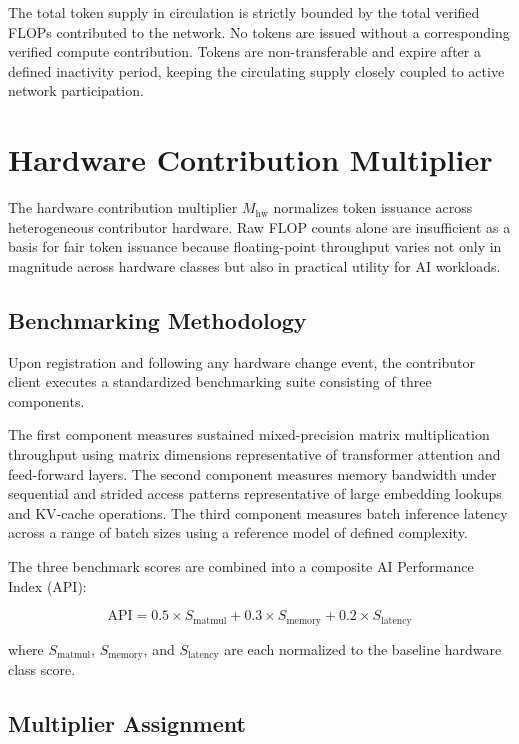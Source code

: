 \documentclass[12pt]{article}
\begin{document}
The total token supply in circulation is strictly bounded by the total verified FLOPs contributed to the network. No tokens are issued without a corresponding verified compute contribution. Tokens are non-transferable and expire after a defined inactivity period, keeping the circulating supply closely coupled to active network participation.

\section{Hardware Contribution Multiplier}
\label{sec:multiplier}

The hardware contribution multiplier $M_{\text{hw}}$ normalizes token issuance across heterogeneous contributor hardware. Raw FLOP counts alone are insufficient as a basis for fair token issuance because floating-point throughput varies not only in magnitude across hardware classes but also in practical utility for AI workloads.

\subsection{Benchmarking Methodology}

Upon registration and following any hardware change event, the contributor client executes a standardized benchmarking suite consisting of three components.

The first component measures sustained mixed-precision matrix multiplication throughput using matrix dimensions representative of transformer attention and feed-forward layers. The second component measures memory bandwidth under sequential and strided access patterns representative of large embedding lookups and KV-cache operations. The third component measures batch inference latency across a range of batch sizes using a reference model of defined complexity.

The three benchmark scores are combined into a composite AI Performance Index (API):

\begin{equation}
\text{API} = 0.5 \times S_{\text{matmul}} + 0.3 \times S_{\text{memory}} + 0.2 \times S_{\text{latency}}
\label{eq:api}
\end{equation}

where $S_{\text{matmul}}$, $S_{\text{memory}}$, and $S_{\text{latency}}$ are each normalized to the baseline hardware class score.

\subsection{Multiplier Assignment}
\end{document}
